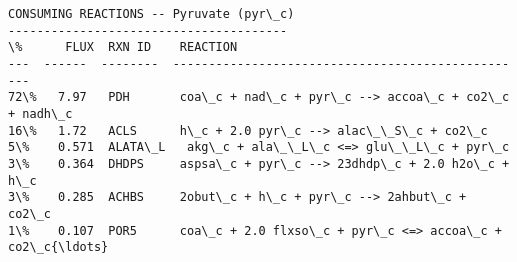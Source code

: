 \documentclass[11pt]{article}
\begin{document}
\begin{Verbatim}[commandchars=\\\{\}]
CONSUMING REACTIONS -- Pyruvate (pyr\_c)
---------------------------------------
\%      FLUX  RXN ID    REACTION
---  ------  --------  --------------------------------------------------
72\%   7.97   PDH       coa\_c + nad\_c + pyr\_c --> accoa\_c + co2\_c + nadh\_c
16\%   1.72   ACLS      h\_c + 2.0 pyr\_c --> alac\_\_S\_c + co2\_c
5\%    0.571  ALATA\_L   akg\_c + ala\_\_L\_c <=> glu\_\_L\_c + pyr\_c
3\%    0.364  DHDPS     aspsa\_c + pyr\_c --> 23dhdp\_c + 2.0 h2o\_c + h\_c
3\%    0.285  ACHBS     2obut\_c + h\_c + pyr\_c --> 2ahbut\_c + co2\_c
1\%    0.107  POR5      coa\_c + 2.0 flxso\_c + pyr\_c <=> accoa\_c + co2\_c{\ldots}

    \end{Verbatim}


    
    
    
    
\end{document}
